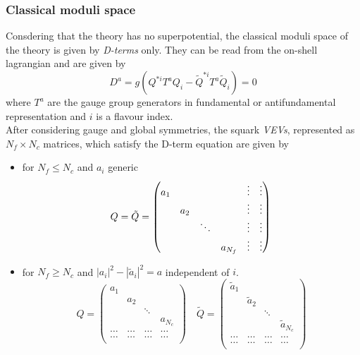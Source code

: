 \subsubsection{Classical moduli space}
Consdering that the theory has no superpotential, the classical moduli space of the theory is given by \emph{D-terms} only. 
They can be read from the on-shell lagrangian and are given by
\begin{equation}
 D^a = g \left( Q^{*i} T^a Q_i - \tilde{Q}^{* i} T^a \tilde{Q}_i \right) = 0
\end{equation}
where $T^a$ are the gauge group generators in fundamental or antifundamental representation and $i$ is a flavour index.
\\
After considering gauge and global symmetries, the squark \emph{VEVs}, represented as $N_f \times N_c$ matrices, which satisfy the D-term equation are given by
\begin{itemize}
\item for $N_f \le N_c$ and $a_i$ generic
\begin{equation}
Q = \tilde{Q} = 
\begin{pmatrix}
 a_1 & 		&	 &	 & \vdots & \vdots \\
	 & a_2  & 	 & 	 & \vdots & \vdots \\  	
 	 & 		&	\ddots &	 &\vdots & \vdots  \\
	 &  & 	 & 	a_{N_f}  & \vdots & \vdots
\end{pmatrix} 
 \\
\end{equation}
\item for $N_f \geq N_c$ and $ | a_i|^2 - | \tilde{a}_i |^2 = a $ independent of $i$.
\begin{equation}
Q  = 
\begin{pmatrix} 
	 a_1 & 		&	 &	  \\
	 & a_2  & 	 & 	 \\  	
 	 & 		&	\ddots &	   \\
	 &  & 	 & 	a_{N_c}  \\
	 \dots & \dots & \dots & \dots\\ 
	 \dots & \dots & \dots & \dots\\ 
\end{pmatrix} 
\quad
\tilde{Q} = 
\begin{pmatrix}
 \tilde{a}_1 & 		&	 &	  \\
	 & \tilde{a}_2  & 	 & 	 \\  	
 	 & 		&	\ddots &	   \\
	 &  & 	 & 	\tilde{a}_{N_c}  \\
	 \dots & \dots & \dots & \dots\\ 
	 \dots & \dots & \dots & \dots\\ 
\end{pmatrix} 
\end{equation}
\end{itemize}
